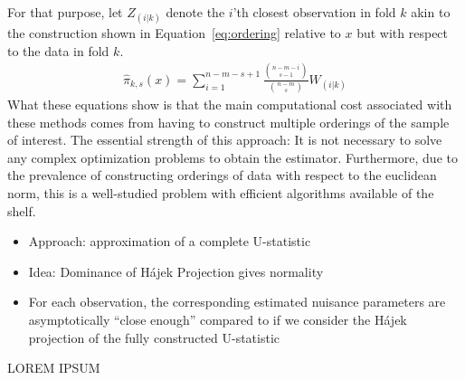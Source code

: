 For that purpose, let $Z_{(i|k)}$ denote the $i$'th closest observation in fold $k$ akin to the construction shown in Equation~\ref{eq:ordering} relative to $x$ but with respect to the data in fold $k$.
\begin{equation}
	\begin{aligned}
		\hat{\pi}_{k,s}\left(x\right)
		= \sum_{i = 1}^{n - m - s + 1} \frac{\binom{n - m - i}{s - 1}}{\binom{n - m}{s}} W_{(i|k)}
	\end{aligned}
\end{equation}
What these equations show is that the main computational cost associated with these methods comes from having to construct multiple orderings of the sample of interest.
The essential strength of this approach: It is not necessary to solve any complex optimization problems to obtain the estimator.
Furthermore, due to the prevalence of constructing orderings of data with respect to the euclidean norm, this is a well-studied problem with efficient algorithms available of the shelf.

{\color{red}
\begin{itemize}
	\item Approach: approximation of a complete U-statistic
	\item Idea: Dominance of H\'ajek Projection gives normality
	\item For each observation, the corresponding estimated nuisance parameters are asymptotically ``close enough'' 
	compared to if we consider the H\'ajek projection of the fully constructed U-statistic
\end{itemize}
}
	{\color{red} LOREM IPSUM}